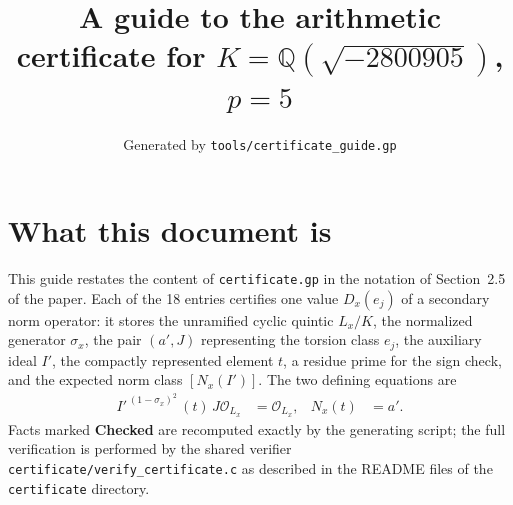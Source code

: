 \documentclass[11pt]{article}
\title{A guide to the arithmetic certificate for $K=\mathbb Q(\sqrt{-2800905})$, $p=5$}
\author{}
\date{Generated by \texttt{tools/certificate\_guide.gp}}
\begin{document}
\maketitle
\section*{What this document is}
This guide restates the content of \texttt{certificate.gp} in the
notation of Section~2.5 of the paper.  Each of the 18 entries
certifies one value $D_x(e_j)$ of a secondary norm operator: it
stores the unramified cyclic quintic $L_x/K$, the normalized
generator $\sigma_x$, the pair $(a',J)$ representing the torsion
class $e_j$, the auxiliary ideal $I'$, the compactly represented
element $t$, a residue prime for the sign check, and the expected
norm class $[N_x(I')]$.  The two defining equations are
\begin{align*}
I'^{\,(1-\sigma_x)^2}\,(t)\,J\mathcal O_{L_x}&=\mathcal O_{L_x},&
N_x(t)&=a'.
\end{align*}
Facts marked \textbf{Checked} are recomputed exactly by the
generating script; the full verification is performed by the
shared verifier \texttt{certificate/verify\_certificate.c} as
described in the README files of the \texttt{certificate}
directory.
\end{document}
